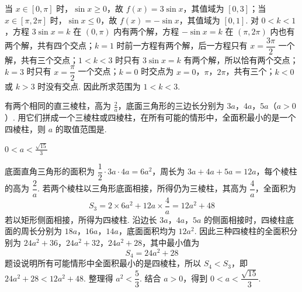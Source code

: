 \begin{solution}
当 \(x\in[0,\pi]\) 时，\(\sin x\geqslant0\)，故 \(f(x)=3\sin x\)，其值域为 \([0,3]\)；当 \(x\in[\pi,2\pi]\) 时，\(\sin x\leqslant0\)，故 \(f(x)=-\sin x\)，其值域为 \([0,1]\). 对 \(0<k<1\)，方程 \(3\sin x=k\) 在 \((0,\pi)\) 内有两个解，方程 \(-\sin x=k\) 在 \((\pi,2\pi)\) 内也有两个解，共有四个交点；\(k=1\) 时前一方程有两个解，后一方程只有 \(x=\dfrac{3\pi}{2}\) 一个解，共有三个交点；\(1<k<3\) 时只有 \(3\sin x=k\) 有两个解，所以恰有两个交点；\(k=3\) 时只有 \(x=\dfrac{\pi}{2}\) 一个交点；\(k=0\) 时交点为 \(x=0\)，\(\pi\)，\(2\pi\)，共有三个；\(k<0\) 或 \(k>3\) 时没有交点. 因此所求范围为 \(1<k<3\).
\end{solution}

\begin{problem}
有两个相同的直三棱柱，高为 \(\frac{2}{a}\)，底面三角形的三边长分别为 \(3a\)，\(4a\)，\(5a\)（\(a > 0\)）. 用它们拼成一个三棱柱或四棱柱，在所有可能的情形中，全面积最小的是一个四棱柱，则 \(a\) 的取值范围是\fillinblank{}.

\end{problem}

\begin{answer}
\(0<a<\frac{\sqrt{15}}{3}\)
\end{answer}

\begin{solution}
底面直角三角形的面积为 \(\dfrac12\cdot3a\cdot4a=6a^2\)，周长为 \(3a+4a+5a=12a\)，每个棱柱的高为 \(\dfrac2a\). 若两个棱柱以三角形底面相接，所得仍为三棱柱，其高为 \(\dfrac4a\)，全面积为
\[
S_{3}=2\times6a^2+12a\times\frac4a=12a^2+48
\]
若以矩形侧面相接，所得为四棱柱. 沿边长 \(3a\)，\(4a\)，\(5a\) 的侧面相接时，四棱柱底面的周长分别为 \(18a\)，\(16a\)，\(14a\)，底面面积均为 \(12a^2\). 因此三种四棱柱的全面积分别为 \(24a^2+36\)，\(24a^2+32\)，\(24a^2+28\)，其中最小值为
\[
S_{4}=24a^2+28
\]
题设说明所有可能情形中全面积最小的是四棱柱，所以 \(S_4<S_3\)，即 \(24a^2+28<12a^2+48\). 整理得 \(a^2<\dfrac53\). 结合 \(a>0\)，得到 \(0<a<\dfrac{\sqrt{15}}3\).
\end{solution}

